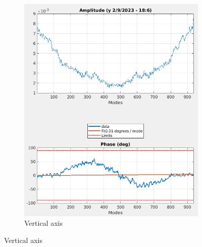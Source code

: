 \documentclass{report}
\begin{document}
\begin{figure}[hbt]
\begin{subfigure}[b]{0.45\textwidth}
        \includegraphics[width=\textwidth]{vlr_modescan_y.png}
        \caption{Vertical axis}
        \label{fig:modescan_example_y}
    \end{subfigure}
    

\end{figure}
\end{document}
